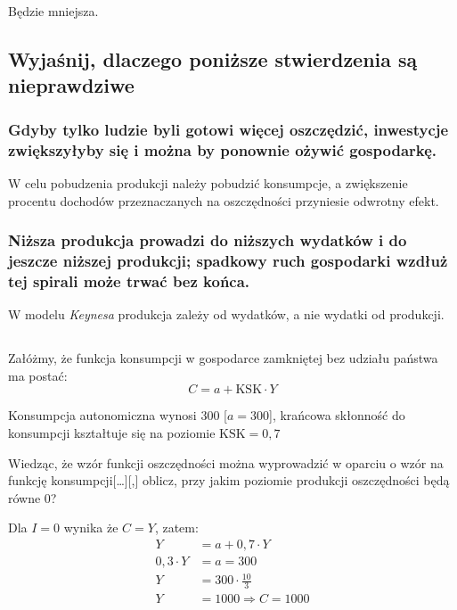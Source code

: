 \documentclass[a4paper,12pt]{article}
\begin{document}
Będzie mniejsza.

\subsection{Wyjaśnij, dlaczego poniższe stwierdzenia są nieprawdziwe}

\subsubsection*{Gdyby tylko ludzie byli gotowi więcej oszczędzić, inwestycje zwiększyłyby się i można by ponownie ożywić gospodarkę.}

W celu pobudzenia produkcji należy pobudzić konsumpcje, a zwiększenie procentu dochodów przeznaczanych na oszczędności przyniesie odwrotny efekt.

\subsubsection*{Niższa produkcja prowadzi do niższych wydatków i do jeszcze niższej produkcji; spadkowy ruch gospodarki wzdłuż tej spirali może trwać bez końca.}

W modelu \emph{Keynesa} produkcja zależy od wydatków, a nie wydatki od produkcji.

\subsection{}

Załóżmy, że funkcja konsumpcji w gospodarce zamkniętej bez udziału państwa ma postać:
\[C = a + \text{KSK} \cdot Y\]

Konsumpcja autonomiczna wynosi 300 [$a = 300$], krańcowa skłonność do konsumpcji kształtuje się na poziomie $\text{KSK} = 0,7$

Wiedząc, że wzór funkcji oszczędności można wyprowadzić w oparciu o wzór na funkcję konsumpcji[\dots][,] oblicz, przy jakim poziomie produkcji oszczędności będą równe 0?

\vspace{1cm}
Dla $I = 0$ wynika że $C = Y$, zatem:
\begin{align*}
	Y           & = a + 0,7 \cdot Y           \\
	0,3 \cdot Y & = a = 300                   \\
	Y           & = 300 \cdot \frac{10}{3}    \\
	Y           & = 1000 \Rightarrow C = 1000
\end{align*}
\end{document}
